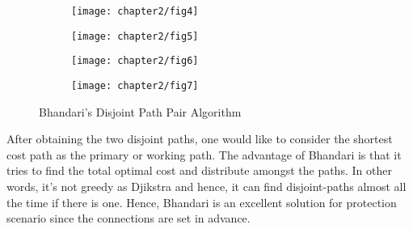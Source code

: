 \begin{figure*}[!hbt]
\centering
      	\begin{subfigure}{0.32\textwidth}
	\centering
		\texttt{[image: chapter2/fig4]}
		\caption{}
		\label{fig:bhandari1}
        \end{subfigure}%
	\hspace{30mm}
	\begin{subfigure}{0.32\textwidth}
        	\centering
		\texttt{[image: chapter2/fig5]}
		\caption{}
		\label{fig:bhandari2}
        \end{subfigure}
\vspace{5mm}
      	\begin{subfigure}{0.32\textwidth}
	\centering
		\texttt{[image: chapter2/fig6]}
		\caption{}
		\label{fig:bhandari3}
        \end{subfigure}%
	\hspace{30mm}
	\begin{subfigure}{0.32\textwidth}
        	\centering
		\texttt{[image: chapter2/fig7]}
		\caption{}
		\label{fig:bhandari4}
        \end{subfigure}
	\hfill
\caption{Bhandari's Disjoint Path Pair Algorithm}
\label{fig:bhandari}
\end{figure*}
                                                              

\indent After obtaining the two disjoint paths, one would like to consider the shortest cost path as the primary or working path. The advantage of Bhandari is that it tries to find the total optimal cost and distribute amongst the paths. In other words, it's not greedy as Djikstra and hence, it can find disjoint-paths almost all the time if there is one. Hence, Bhandari is an excellent solution for protection scenario since the connections are set in advance. 
